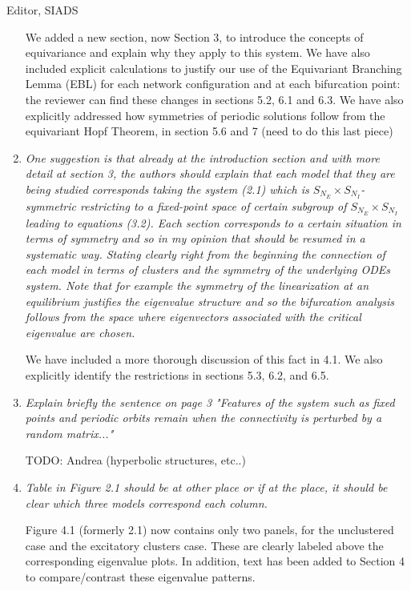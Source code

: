 \documentclass[11pt]{letter}
\begin{document}
\begin{letter}{Editor, SIADS}
\begin{enumerate}
We added a new section, now Section 3, to introduce the concepts of equivariance and explain why they apply to this system. We have also included explicit calculations to justify our use of the Equivariant Branching Lemma (EBL) for each network configuration and at each bifurcation point: the reviewer can find these changes in sections 5.2, 6.1 and 6.3. We have also explicitly addressed how symmetries of periodic solutions follow from the equivariant Hopf Theorem, in section 5.6 and 7 (need to do this last piece)

\item \emph{One suggestion is that already at the introduction section and with more detail at section 3, the authors should explain that each model that they are being studied corresponds taking the system (2.1) which is $S_{N_E} \times S_{N_I}$-symmetric restricting to a fixed-point space of certain subgroup of $S_{N_E} \times S_{N_I}$ leading to equations (3.2). Each section corresponds to a certain situation in terms of symmetry and so in my opinion that should be resumed in a systematic way. Stating clearly right from the beginning the connection of each model in terms of clusters and the symmetry of the underlying ODEs system. Note that for example the symmetry of the linearization at an equilibrium justifies the eigenvalue structure and so the bifurcation analysis follows from the space where eigenvectors associated with the critical eigenvalue are chosen.}
\vspace{4mm}

We have included a more thorough discussion of this fact in 4.1. We also explicitly identify the restrictions in sections 5.3, 6.2, and 6.5.

\item \emph{Explain briefly the sentence on page 3 "Features of the system such as fixed points and periodic orbits remain when the connectivity is perturbed by a random matrix..."}
\vspace{4mm} 

TODO: Andrea (hyperbolic structures, etc..)

\item \emph{Table in Figure 2.1 should be at other place or if at the place, it should be clear which three models correspond each column.}
\vspace{4mm}

Figure 4.1 (formerly 2.1) now contains only two panels, for the unclustered case and the excitatory clusters case. These are clearly labeled above the corresponding eigenvalue plots. In addition, text has been added to Section 4 to compare/contrast these eigenvalue patterns.


\end{enumerate}
\end{letter}
\end{document}
